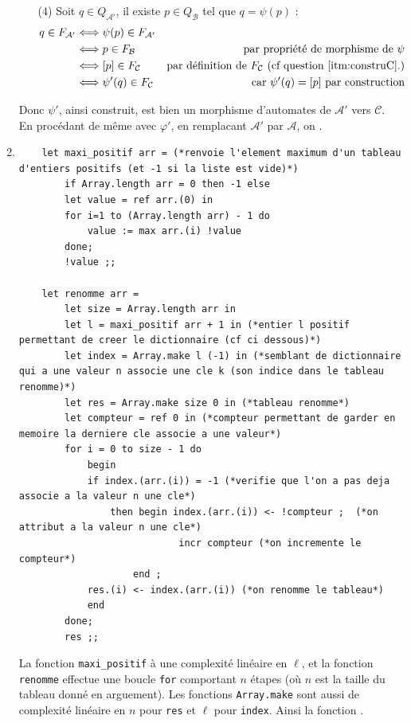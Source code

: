 \documentclass{article}
\begin{document}
\begin{enumerate}
\begin{itemize}
        \item[(4)] Soit $q \in Q_\mathcal{A'}$, il existe $p \in Q_\mathcal{B}$ tel que $q = \psi(p)$ : 
            \begin{align*}
                q \in F_\mathcal{A'} & \Longleftrightarrow \psi(p) \in F_\mathcal{A'} & \\
                & \Longleftrightarrow p \in F_\mathcal{B} & \text{par propriété de morphisme de $\psi$} \\
                & \Longleftrightarrow [p] \in F_\mathcal{C} & \text{par définition de $F_\mathcal{C}$ (cf question \ref{itm:construC}.)} \\
                & \Longleftrightarrow \psi'(q) \in F_\mathcal{C} & \text{car $\psi'(q) = [p]$ par construction} 
            \end{align*}
    \end{itemize}
    Donc $\psi'$, ainsi construit, est bien un morphisme d'automates de $\mathcal{A'}$ vers $\mathcal{C}$. En procédant de même avec $\varphi'$, en remplacant $\mathcal{A'}$ par $\mathcal{A}$, on .
    \item 
    \begin{verbatim}
    let maxi_positif arr = (*renvoie l'element maximum d'un tableau d'entiers positifs (et -1 si la liste est vide)*)
        if Array.length arr = 0 then -1 else
        let value = ref arr.(0) in 
        for i=1 to (Array.length arr) - 1 do
            value := max arr.(i) !value
        done; 
        !value ;; 
        
    let renomme arr =
        let size = Array.length arr in 
        let l = maxi_positif arr + 1 in (*entier l positif permettant de creer le dictionnaire (cf ci dessous)*)
        let index = Array.make l (-1) in (*semblant de dictionnaire qui a une valeur n associe une cle k (son indice dans le tableau renomme)*)
        let res = Array.make size 0 in (*tableau renomme*)
        let compteur = ref 0 in (*compteur permettant de garder en memoire la derniere cle associe a une valeur*)
        for i = 0 to size - 1 do
            begin
            if index.(arr.(i)) = -1 (*verifie que l'on a pas deja associe a la valeur n une cle*)
                then begin index.(arr.(i)) <- !compteur ;  (*on attribut a la valeur n une cle*)
                            incr compteur (*on incremente le compteur*)
                    end ;
            res.(i) <- index.(arr.(i)) (*on renomme le tableau*)
            end
        done;
        res ;;
    \end{verbatim}
    La fonction \verb|maxi_positif| à une complexité linéaire en $\ell$, et la fonction \verb|renomme| effectue une boucle \verb|for| comportant $n$ étapes (où $n$ est la taille du tableau donné en arguement). Les fonctions \verb|Array.make| sont aussi de complexité linéaire en $n$ pour \verb|res| et $\ell$ pour \verb|index|. \newline 
    Ainsi la fonction \cprotect{}.


\end{enumerate}
\end{document}
